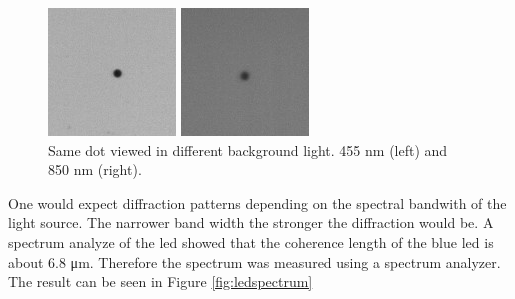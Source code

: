 \begin{figure}
\centering
\begin{minipage}{.5\textwidth}
  \centering
  \includegraphics[width=.6\linewidth]{figures/compare455nmdot}
\end{minipage}%
\begin{minipage}{.5\textwidth}
  \centering
  \includegraphics[width=.6\linewidth]{figures/compare850nmdot}
\end{minipage}
\caption{Same dot viewed in different background light. 455 nm (left) and 850 nm (right).}
\label{fig:comparedots}
\end{figure}

One would expect diffraction patterns depending on the spectral bandwith of the light source. The narrower band width the stronger the diffraction would be. A spectrum analyze of the \gls{led} showed that the coherence length of the blue \gls{led} is about 6.8 μm. Therefore the spectrum was measured using a spectrum analyzer. The result can be seen in Figure \ref{fig:ledspectrum}

